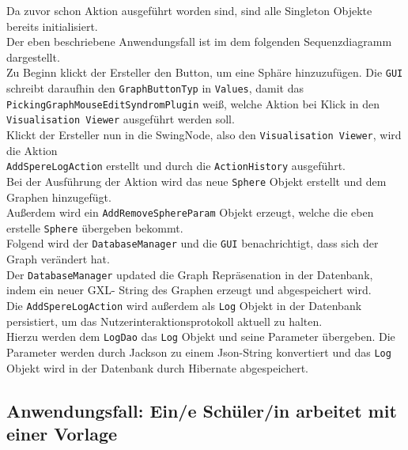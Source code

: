 \documentclass[enabledeprecatedfontcommands,fontsize=11pt,paper=a4,twoside]{scrartcl}
\begin{document}
Da zuvor schon Aktion ausgeführt worden sind, sind alle Singleton Objekte bereits initialisiert. \\
Der eben beschriebene Anwendungsfall ist im dem folgenden Sequenzdiagramm dargestellt. \\
Zu Beginn klickt der Ersteller den Button, um eine Sphäre hinzuzufügen. Die \texttt{GUI} schreibt daraufhin den \texttt{GraphButtonTyp} in \texttt{Values}, damit das \texttt{PickingGraphMouseEditSyndromPlugin} weiß, welche Aktion bei Klick in den \texttt{Visualisation Viewer} ausgeführt werden soll. \\
Klickt der Ersteller nun in die SwingNode, also den  \texttt{Visualisation Viewer}, wird die Aktion\\ \texttt{AddSpereLogAction} erstellt und durch die \texttt{ActionHistory} ausgeführt. \\
Bei der Ausführung der Aktion wird das neue \texttt{Sphere} Objekt erstellt und dem Graphen hinzugefügt. \\
Außerdem wird ein \texttt{AddRemoveSphereParam} Objekt erzeugt, welche die eben erstelle \texttt{Sphere} übergeben bekommt. \\
Folgend wird der \texttt{DatabaseManager} und die \texttt{GUI} benachrichtigt, dass sich der Graph verändert hat. \\
Der \texttt{DatabaseManager} updated die Graph Repräsenation in der Datenbank, indem ein neuer GXL- String des Graphen erzeugt und abgespeichert wird.\\
Die \texttt{AddSpereLogAction} wird außerdem als \texttt{Log} Objekt in der Datenbank persistiert, um das Nutzerinteraktionsprotokoll aktuell zu halten. \\
Hierzu werden dem \texttt{LogDao} das \texttt{Log} Objekt und seine Parameter übergeben. Die Parameter werden durch Jackson zu einem Json-String konvertiert und das \texttt{Log} Objekt wird in der Datenbank durch Hibernate abgespeichert.










\newpage

\subsection{Anwendungsfall: Ein/e Schüler/in arbeitet mit einer Vorlage}
\end{document}
